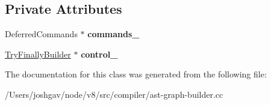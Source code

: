 \subsection*{Private Attributes}
\begin{DoxyCompactItemize}
\item 
Deferred\+Commands $\ast$ {\bfseries commands\+\_\+}\hypertarget{classv8_1_1internal_1_1compiler_1_1_ast_graph_builder_1_1_control_scope_for_finally_a6c6d71e05ee4ffe4e17bb79f6386d04d}{}\label{classv8_1_1internal_1_1compiler_1_1_ast_graph_builder_1_1_control_scope_for_finally_a6c6d71e05ee4ffe4e17bb79f6386d04d}

\item 
\hyperlink{classv8_1_1internal_1_1compiler_1_1_try_finally_builder}{Try\+Finally\+Builder} $\ast$ {\bfseries control\+\_\+}\hypertarget{classv8_1_1internal_1_1compiler_1_1_ast_graph_builder_1_1_control_scope_for_finally_a111537c1ea04bff81d6be3008be130e6}{}\label{classv8_1_1internal_1_1compiler_1_1_ast_graph_builder_1_1_control_scope_for_finally_a111537c1ea04bff81d6be3008be130e6}

\end{DoxyCompactItemize}


The documentation for this class was generated from the following file\+:\begin{DoxyCompactItemize}
\item 
/\+Users/joshgav/node/v8/src/compiler/ast-\/graph-\/builder.\+cc\end{DoxyCompactItemize}
